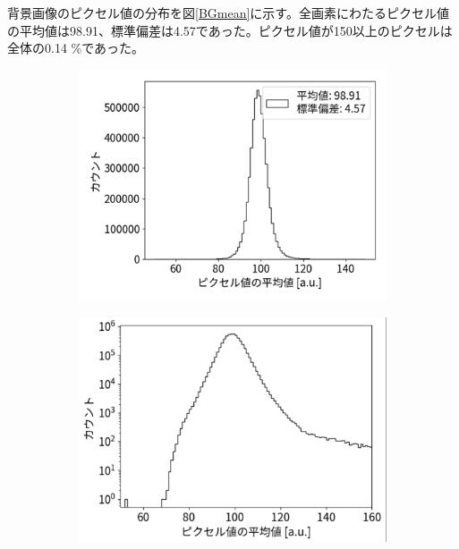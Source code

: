 \documentclass[a4paper,11pt,uplatex]{jsbook}
\begin{document}
背景画像のピクセル値の分布を図\ref{BGmean}に示す。全画素にわたるピクセル値の平均値は98.91、標準偏差は4.57であった。ピクセル値が150以上のピクセルは全体の0.14 \%であった。
\begin{figure}[h]
  \centering
  \begin{subfigure}[b]{0.45\linewidth}
    \centering
    \includegraphics[width=\linewidth]{image/4-BGmean.png}
  \end{subfigure}
  \hfill
  \begin{subfigure}[b]{0.45\linewidth}
    \centering
    \includegraphics[width=\linewidth]{image/4-BGmeanlog.png}
  \end{subfigure}

\end{figure}
\end{document}
